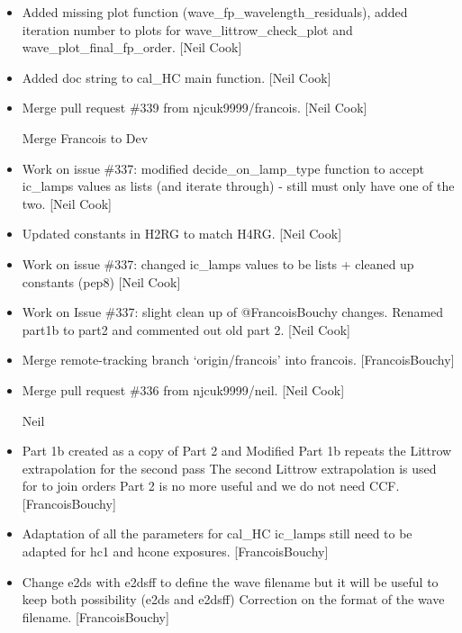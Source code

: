 \documentclass[a4paper,10pt,english]{report}
\begin{document}
\begin{itemize}
\item {} 
Added missing plot function (wave\_fp\_wavelength\_residuals), added
iteration number to plots for wave\_littrow\_check\_plot and
wave\_plot\_final\_fp\_order. {[}Neil Cook{]}

\item {} 
Added doc string to cal\_HC main function. {[}Neil Cook{]}

\item {} 
Merge pull request \#339 from njcuk9999/francois. {[}Neil Cook{]}

Merge Francois to Dev

\item {} 
Work on issue \#337: modified decide\_on\_lamp\_type function to accept
ic\_lamps values as lists (and iterate through) - still must only have
one of the two. {[}Neil Cook{]}

\item {} 
Updated constants in H2RG to match H4RG. {[}Neil Cook{]}

\item {} 
Work on issue \#337: changed ic\_lamps values to be lists + cleaned up
constants (pep8) {[}Neil Cook{]}

\item {} 
Work on Issue \#337: slight clean up of @FrancoisBouchy changes.
Renamed part1b to part2 and commented out old part 2. {[}Neil Cook{]}

\item {} 
Merge remote-tracking branch ‘origin/francois’ into francois.
{[}FrancoisBouchy{]}

\item {} 
Merge pull request \#336 from njcuk9999/neil. {[}Neil Cook{]}

Neil

\item {} 
Part 1b created as a copy of Part 2 and Modified Part 1b repeats the
Littrow extrapolation for the second pass The second Littrow
extrapolation is used for to join orders Part 2 is no more useful and
we do not need CCF. {[}FrancoisBouchy{]}

\item {} 
Adaptation of all the parameters for cal\_HC ic\_lamps still need to be
adapted for hc1 and hcone exposures. {[}FrancoisBouchy{]}

\item {} 
Change e2ds with e2dsff to define the wave filename but it will be
useful to keep both possibility (e2ds and e2dsff) Correction on the
format of the wave filename. {[}FrancoisBouchy{]}


\end{itemize}
\end{document}

